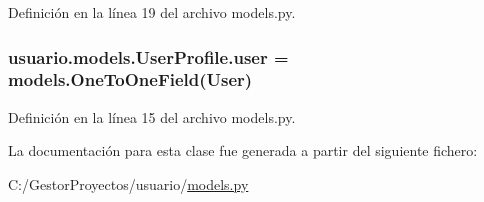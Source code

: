 Definición en la línea 19 del archivo models.\+py.

\subsubsection[{\texorpdfstring{user}{user}}]{\setlength{\rightskip}{0pt plus 5cm}usuario.\+models.\+User\+Profile.\+user = models.\+One\+To\+One\+Field(User)\hspace{0.3cm}{\ttfamily [static]}}\hypertarget{classusuario_1_1models_1_1_user_profile_a8ef66edb95efb90536802ef5bd470f4b}{}\label{classusuario_1_1models_1_1_user_profile_a8ef66edb95efb90536802ef5bd470f4b}


Definición en la línea 15 del archivo models.\+py.



La documentación para esta clase fue generada a partir del siguiente fichero\+:\begin{DoxyCompactItemize}
\item 
C\+:/\+Gestor\+Proyectos/usuario/\hyperlink{usuario_2models_8py}{models.\+py}\end{DoxyCompactItemize}
